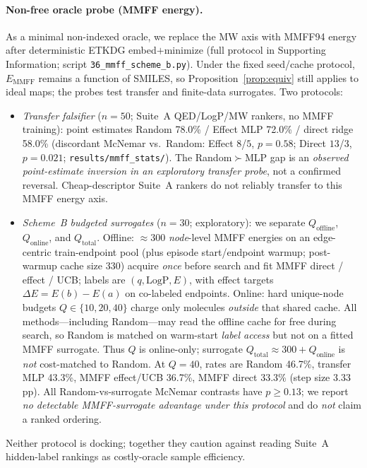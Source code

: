 \paragraph{Non-free oracle probe (MMFF energy).}
As a minimal non-indexed oracle, we replace the MW axis with MMFF94 energy after deterministic ETKDG embed$+$minimize (full protocol in Supporting Information; script \texttt{36\_mmff\_scheme\_b.py}). Under the fixed seed/cache protocol, $E_{\mathrm{MMFF}}$ remains a function of SMILES, so Proposition~\ref{prop:equiv} still applies to ideal maps; the probes test transfer and finite-data surrogates. Two protocols:
\begin{itemize}
  \item \emph{Transfer falsifier} ($n{=}50$; Suite~A QED/LogP/MW rankers, no MMFF training): point estimates Random 78.0\% / Effect MLP 72.0\% / direct ridge 58.0\% (discordant McNemar vs.\ Random: Effect $8$/$5$, $p{=}0.58$; Direct $13$/$3$, $p{=}0.021$; \texttt{results/mmff\_stats/}). The Random$\succ$MLP gap is an \emph{observed point-estimate inversion in an exploratory transfer probe}, not a confirmed reversal. Cheap-descriptor Suite~A rankers do not reliably transfer to this MMFF energy axis.
  \item \emph{Scheme~B budgeted surrogates} ($n{=}30$; exploratory): we separate $Q_{\mathrm{offline}}$, $Q_{\mathrm{online}}$, and $Q_{\mathrm{total}}$. Offline: $\approx$300 \emph{node}-level MMFF energies on an edge-centric train-endpoint pool (plus episode start/endpoint warmup; post-warmup cache size 330) acquire \emph{once} before search and fit MMFF direct / effect / UCB; labels are $(q,\mathrm{LogP},E)$, with effect targets $\Delta E{=}E(b){-}E(a)$ on co-labeled endpoints. Online: hard unique-node budgets $Q{\in}\{10,20,40\}$ charge only molecules \emph{outside} that shared cache. All methods---including Random---may read the offline cache for free during search, so Random is matched on warm-start \emph{label access} but not on a fitted MMFF surrogate. Thus $Q$ is online-only; surrogate $Q_{\mathrm{total}}{\approx}300{+}Q_{\mathrm{online}}$ is \emph{not} cost-matched to Random. At $Q{=}40$, rates are Random 46.7\%, transfer MLP 43.3\%, MMFF effect/UCB 36.7\%, MMFF direct 33.3\% (step size $3.33$pp). All Random-vs-surrogate McNemar contrasts have $p{\ge}0.13$; we report \emph{no detectable MMFF-surrogate advantage under this protocol} and do \emph{not} claim a ranked ordering.
\end{itemize}
Neither protocol is docking; together they caution against reading Suite~A hidden-label rankings as costly-oracle sample efficiency.

